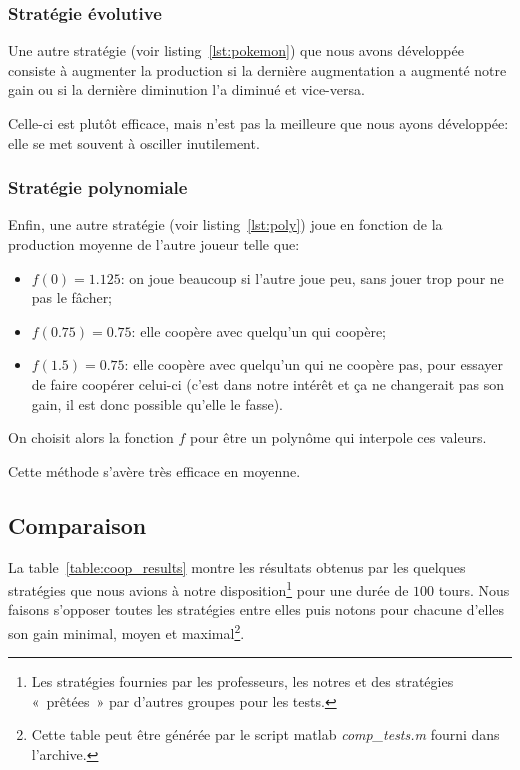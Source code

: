 \documentclass{scrartcl}
\begin{document}
    \subsubsection{Stratégie évolutive}
      Une autre stratégie (voir listing~\ref{lst:pokemon}) que nous avons
      développée consiste à augmenter la production si la dernière augmentation
      a augmenté notre gain ou si la dernière diminution l'a diminué et
      vice-versa.

      Celle-ci est plutôt efficace, mais n'est pas la meilleure que nous ayons
      développée: elle se met souvent à osciller inutilement.

    \subsubsection{Stratégie polynomiale}
      Enfin, une autre stratégie (voir listing~\ref{lst:poly}) joue en fonction
      de la production moyenne de l'autre joueur telle que:
      \begin{itemize}
        \item $f(0) = 1.125$: on joue beaucoup si l'autre joue peu, sans jouer
          trop pour ne pas le fâcher;
        \item $f(0.75) = 0.75$: elle coopère avec quelqu'un qui coopère;
        \item $f(1.5) = 0.75$: elle coopère avec quelqu'un qui ne coopère pas,
          pour essayer de faire coopérer celui-ci (c'est dans notre intérêt et
          ça ne changerait pas son gain, il est donc possible qu'elle le
          fasse).
      \end{itemize}

      On choisit alors la fonction $f$ pour être un polynôme qui interpole ces
      valeurs.

      Cette méthode s'avère très efficace en moyenne.

  \subsection{Comparaison}
    La table~\ref{table:coop_results} montre les résultats obtenus par les
    quelques stratégies que nous avions à notre disposition\footnote{Les
    stratégies fournies par les professeurs, les notres et des stratégies
    «~prêtées~» par d'autres groupes pour les tests.} pour une durée de $100$
    tours. Nous faisons s'opposer toutes les stratégies entre elles puis notons
    pour chacune d'elles son gain minimal, moyen et maximal\footnote{Cette
    table peut être générée par le script matlab \textit{comp\_tests.m} fourni
    dans l'archive.}.
\end{document}
